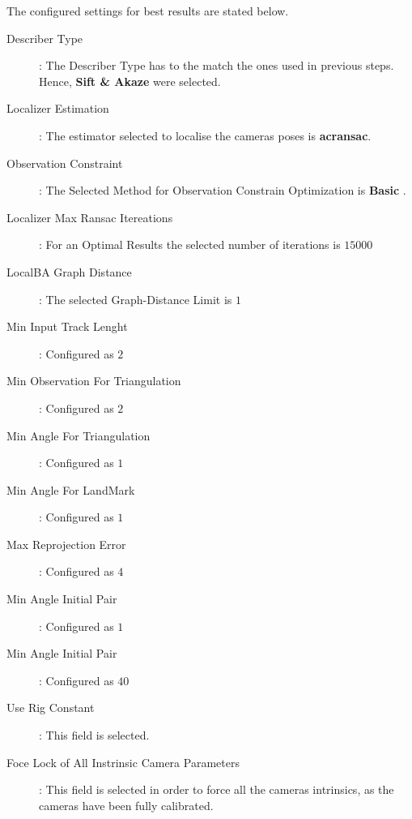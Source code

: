 \documentclass[12pt]{report}
\begin{document}
The configured settings for best results are stated below.
\begin{description}
  \item[Describer Type] : The Describer Type has to the match the ones used in previous steps. Hence, \textbf{Sift \& Akaze} were selected.
  \item[Localizer Estimation]: The estimator selected to localise the cameras poses is \textbf{acransac}.
  \item[Observation Constraint]: The Selected Method  for Observation Constrain Optimization is \textbf{Basic} .
  \item[Localizer Max Ransac Itereations]: For an Optimal Results the selected number of iterations is $15000$
  \item[LocalBA Graph Distance]: The selected Graph-Distance Limit is $1$
  \item[Min Input Track Lenght]: Configured as $2$
  \item[Min Observation For Triangulation]: Configured as $2$
  \item[Min Angle For Triangulation] : Configured as $1$
  \item[Min Angle For LandMark]: Configured as $1$ 
  \item[Max Reprojection Error]: Configured as $4$
  \item[Min Angle Initial Pair]: Configured as $1$ 
  \item[Min Angle Initial Pair]: Configured as $40$
  \item[Use Rig Constant]: This field is selected.
  \item[Foce Lock of All Instrinsic Camera Parameters]: This field is selected in order to force all the cameras intrinsics, as the cameras have been fully calibrated.   
\end{description}
\end{document}
